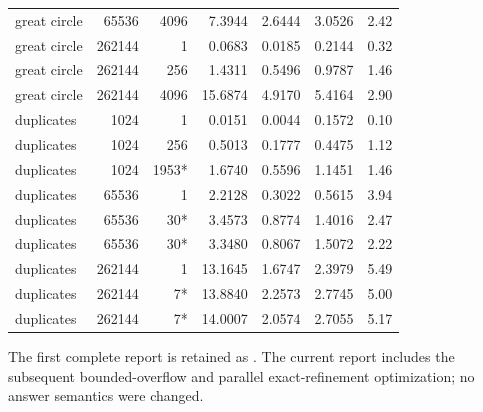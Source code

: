 {\begin{longtable}{@{}lrrrrrr@{}}
great circle & 65536 & 4096 & 7.3944 & 2.6444 & 3.0526 & 2.42\\
great circle & 262144 & 1 & 0.0683 & 0.0185 & 0.2144 & 0.32\\
great circle & 262144 & 256 & 1.4311 & 0.5496 & 0.9787 & 1.46\\
great circle & 262144 & 4096 & 15.6874 & 4.9170 & 5.4164 & 2.90\\
duplicates & 1024 & 1 & 0.0151 & 0.0044 & 0.1572 & 0.10\\
duplicates & 1024 & 256 & 0.5013 & 0.1777 & 0.4475 & 1.12\\
duplicates & 1024 & 1953* & 1.6740 & 0.5596 & 1.1451 & 1.46\\
duplicates & 65536 & 1 & 2.2128 & 0.3022 & 0.5615 & 3.94\\
duplicates & 65536 & 30* & 3.4573 & 0.8774 & 1.4016 & 2.47\\
duplicates & 65536 & 30* & 3.3480 & 0.8067 & 1.5072 & 2.22\\
duplicates & 262144 & 1 & 13.1645 & 1.6747 & 2.3979 & 5.49\\
duplicates & 262144 & 7* & 13.8840 & 2.2573 & 2.7745 & 5.00\\
duplicates & 262144 & 7* & 14.0007 & 2.0574 & 2.7055 & 5.17\\
\end{longtable}}
The first complete report is retained as .
The current report includes the subsequent bounded-overflow and parallel
exact-refinement optimization; no answer semantics were changed.
